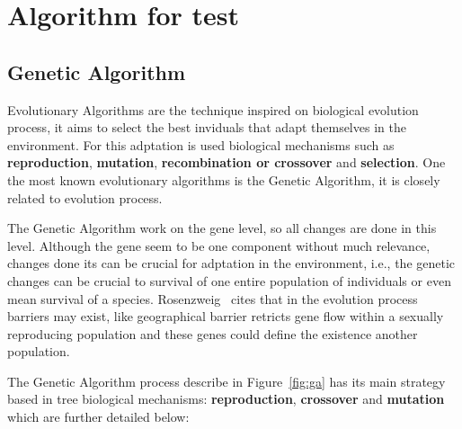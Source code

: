 \chapter{Algorithm for test}
\label{cha:bacAlg}

\section{Genetic Algorithm}
\label{subsec:evolutionay_algorithms}
Evolutionary Algorithms are the technique inspired on biological evolution process,
it aims to select the best inviduals that adapt themselves in the environment. For
this adptation is used biological mechanisms such as \textbf{reproduction}, \textbf{mutation},
\textbf{recombination or crossover} and \textbf{selection}. One the most known
evolutionary algorithms is the Genetic Algorithm, it is closely related to evolution
process.

The Genetic Algorithm work on the gene level, so all changes are done in this level.
Although the gene seem to be one component without much relevance, changes done
its can be crucial for adptation in the environment, i.e., the genetic changes
can be crucial to survival of one entire population of individuals or even mean
survival of a species. Rosenzweig~\cite{rosenzweig:1995} cites that in the evolution
process barriers may exist, like geographical barrier retricts gene flow within
a sexually reproducing population and these genes could define the existence another
population.

The Genetic Algorithm process describe in Figure~\ref{fig:ga} has its main strategy
based in tree biological mechanisms: \textbf{reproduction}, \textbf{crossover}
and \textbf{mutation} which are further detailed below:

